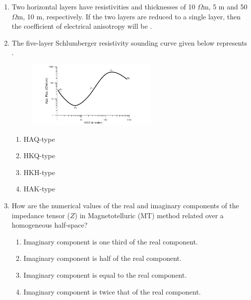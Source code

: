 \documentclass[journal,12pt,onecolumn]{IEEEtran}
\begin{document}
\begin{enumerate}
\begin{enumerate}
\hfill{}

\item Two horizontal layers have resistivities and thicknesses of 10 $\Omega$m, 5 m and 50 $\Omega$m, 10 m, respectively. If the two layers are reduced to a single layer, then the coefficient of electrical anisotropy will be \underline{\hspace{3cm}}.

\hfill{}

\newpage

\item The five-layer Schlumberger resistivity sounding curve given below represents \underline{\hspace{3cm}}.


\hfill{}

\begin{figure}[h]
\centering
\includegraphics[width=0.6\textwidth]{figs/fig14.png}
\caption{}
\label{fig:q44}
\end{figure}



\begin{multicols}{4}
\begin{enumerate}[label=(\Alph*)]
\item HAQ-type
\item HKQ-type
\item HKH-type
\item HAK-type
\end{enumerate}
\end{multicols}



\item How are the numerical values of the real and imaginary components of the impedance tensor ($Z$) in Magnetotelluric (MT) method related over a homogeneous half-space?

\hfill{}


\begin{enumerate}[label=(\Alph*)]
\item Imaginary component is one third of the real component.
\item Imaginary component is half of the real component.
\item Imaginary component is equal to the real component.
\item Imaginary component is twice that of the real component.
\end{enumerate}



\end{enumerate}
\end{enumerate}
\end{document}
